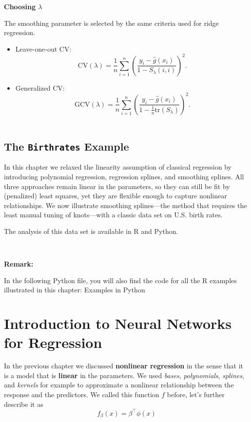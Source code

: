 \documentclass[
]{book}
\begin{document}
\textbf{Choosing \(\lambda\)}

The smoothing parameter is selected by the same criteria used for ridge regression.

\begin{itemize}
\item
  Leave-one-out CV:
  \[
  \text{CV}(\lambda) = \frac{1}{n} \sum_{i=1}^n \left( \frac{y_i - \hat g(x_i)}{1 - S_\lambda(i,i)} \right)^2.
  \]
\item
  Generalized CV:
  \[
  \text{GCV}(\lambda) = \frac{1}{n} \sum_{i=1}^n \left( \frac{y_i - \hat g(x_i)}{1 - \tfrac{1}{n}\text{tr}(S_\lambda)} \right)^2.
  \]
  ~
\end{itemize}

\section{\texorpdfstring{The \texttt{Birthrates} Example}{The Birthrates Example}}\label{the-birthrates-example}

In this chapter we relaxed the linearity assumption of classical regression by introducing polynomial regression, regression splines, and smoothing splines. All three approaches remain linear in the parameters, so they can still be fit by (penalized) least squares, yet they are flexible enough to capture nonlinear relationships. We now illustrate smoothing splines---the method that requires the least manual tuning of knots---with a classic data set on U.S. birth rates.

The analysis of this data set is available in R and Python.

~ ~ ~

\textbf{Remark:}

In the following Python file, you will also find the code for all the R examples illustrated in this chapter:
Examples in Python

\chapter{Introduction to Neural Networks for Regression}\label{introduction-to-neural-networks-for-regression}

In the previous chapter we discussed \textbf{nonlinear regression} in the sense that it is a model that is \textbf{linear} in the parameters. We used \emph{bases}, \emph{polynomials}, \emph{splines}, and \emph{kernels} for example to approximate a nonlinear relationship between the response and the predictors. We called this function \(f\) before, let's further describe it as
\[
f_\beta(x)=\beta^\top\phi(x)
\]
\end{document}
